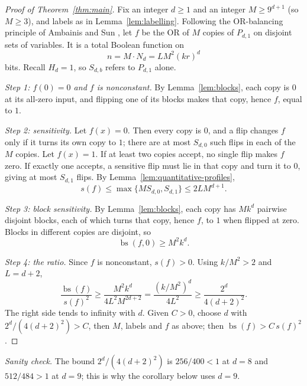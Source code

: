\documentclass[11pt]{article}
\newcommand{\bs}{\operatorname{bs}}
\theoremstyle{definition}
\theoremstyle{remark}
\begin{document}
\begin{proof}[Proof of Theorem~\ref{thm:main}]
Fix an integer $d\ge1$ and an integer $M\ge9^{d+1}$ (so $M\ge3$), and labels
as in Lemma~\ref{lem:labelling}. Following the OR-balancing principle of
Ambainis and Sun \cite[Section~4, Lemma~1]{AmbainisSun2011}, let $f$ be the
OR of $M$ copies of $P_{d,1}$ on disjoint sets of variables. It is a total
Boolean function on
\begin{equation}
\label{eq:final-dimension}
 n=M\cdot N_d=LM^2(kr)^d
\end{equation}
bits. Recall $H_d=1$, so $S_{d,b}$ refers to $P_{d,1}$ alone.

\emph{Step 1: $f(0)=0$ and $f$ is nonconstant.} By Lemma~\ref{lem:blocks},
each copy is $0$ at its all-zero input, and flipping one of its blocks makes
that copy, hence $f$, equal to $1$.

\emph{Step 2: sensitivity.} Let $f(x)=0$. Then every copy is $0$, and a flip
changes $f$ only if it turns its own copy to $1$; there are at most $S_{d,0}$
such flips in each of the $M$ copies. Let $f(x)=1$. If at least two copies
accept, no single flip makes $f$ zero. If exactly one accepts, a sensitive
flip must lie in that copy and turn it to $0$, giving at most $S_{d,1}$
flips. By Lemma~\ref{lem:quantitative-profiles},
\begin{equation}
\label{eq:final-sensitivity}
 s(f)\leq\max\{M S_{d,0},S_{d,1}\}
       \leq2L M^{d+1}.
\end{equation}

\emph{Step 3: block sensitivity.} By Lemma~\ref{lem:blocks}, each copy has
$Mk^d$ pairwise disjoint blocks, each of which turns that copy, hence $f$,
to $1$ when flipped at zero. Blocks in different copies are disjoint, so
\begin{equation}
\label{eq:final-block-sensitivity}
 \bs(f,0)\geq M^2k^d.
\end{equation}

\emph{Step 4: the ratio.} Since $f$ is nonconstant, $s(f)>0$. Using
$k/M^2>2$ and $L=d+2$,
\begin{equation}
\label{eq:ratio-separation}
 \frac{\bs(f)}{s(f)^2}
 \geq\frac{M^2k^d}{4L^2M^{2d+2}}
 =\frac{(k/M^2)^d}{4L^2}
 \geq\frac{2^d}{4(d+2)^2}.
\end{equation}
The right side tends to infinity with $d$. Given $C>0$, choose $d$ with
$2^d/(4(d+2)^2)>C$, then $M$, labels and $f$ as above; then
$\bs(f)>C\,s(f)^2$.
\end{proof}

\emph{Sanity check.} The bound $2^d/(4(d+2)^2)$ is $256/400<1$ at $d=8$ and
$512/484>1$ at $d=9$; this is why the corollary below uses $d=9$.
\end{document}
